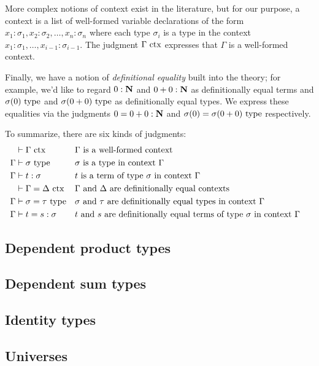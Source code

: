 \documentclass[a4paper]{article}
\begin{document}
More complex notions of context exist in the literature, but for our purpose, a context is a list of well-formed variable declarations of the form $x_1 : \sigma_1, x_2 : \sigma_2, \ldots, x_n : \sigma_n$ where each type $\sigma_i$ is a type in the context $x_1 : \sigma_1,\ldots, x_{i-1} : \sigma_{i-1}$.
The judgment $\Gamma~\mathrm{ctx}$ expresses that $\Gamma$ is a well-formed context.

Finally, we have a notion of \emph{definitional equality} built into the theory; for example, we'd like to regard $0 : \mathbf{N}$ and $0 + 0 : \mathbf{N}$ as definitionally equal terms and $\sigma(0)~\mathrm{type}$ and $\sigma(0+0)~\mathrm{type}$ as definitionally equal types.
We express these equalities via the judgments $0 = 0 + 0 : \mathbf{N}$ and $\sigma(0) = \sigma(0+0)~\mathrm{type}$ respectively.

To summarize, there are six kinds of judgments:
\begin{align*}
  &\vdash \Gamma~\mathrm{ctx} && \text{$\Gamma$ is a well-formed context}&&\\
  \Gamma &\vdash \sigma~\mathrm{type} && \text{$\sigma$ is a type in context $\Gamma$}&&\\
  \Gamma &\vdash t : \sigma && \text{$t$ is a term of type $\sigma$ in context $\Gamma$}&&\\
  &\vdash \Gamma = \Delta~\mathrm{ctx} && \text{$\Gamma$ and $\Delta$ are definitionally equal contexts}&&\\
  \Gamma &\vdash \sigma = \tau~\mathrm{type} && \text{$\sigma$ and $\tau$ are definitionally equal types in context $\Gamma$}&&\\
  \Gamma &\vdash t = s : \sigma && \text{$t$ and $s$ are definitionally equal terms of type $\sigma$ in context $\Gamma$}&&\\
\end{align*}

\subsection{Dependent product types}\label{sec:dpt}
\subsection{Dependent sum types}\label{sec:dst}
\subsection{Identity types}\label{sec:it}
\subsection{Universes}\label{sec:u}
\end{document}
